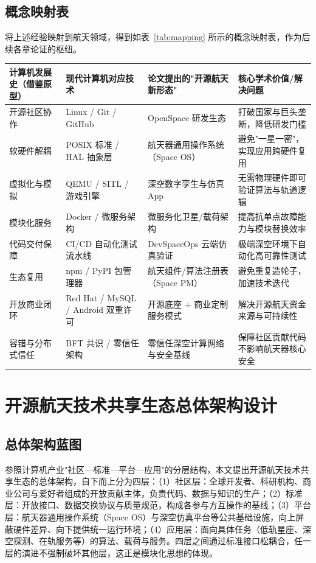\documentclass[UTF8,a4paper,zihao=-4]{ctexart}
\begin{document}
\subsection{概念映射表}
将上述经验映射到航天领域，得到如表~\ref{tab:mapping} 所示的概念映射表，作为后续各章论证的枢纽。

\begin{landscape}
\vfill
\centering
{}
\label{tab:mapping}
\begin{tabularx}{\textheight}{@{}>{\raggedright\arraybackslash}X>{\raggedright\arraybackslash}X>{\raggedright\arraybackslash}X>{\raggedright\arraybackslash}X@{}}
\toprule
计算机发展史（借鉴原型） & 现代计算机对应技术 & 论文提出的"开源航天新形态" & 核心学术价值/解决问题 \\
\midrule
开源社区协作 & Linux / Git / GitHub & OpenSpace 研发生态 & 打破国家与巨头垄断，降低研发门槛 \\
软硬件解耦 & POSIX 标准 / HAL 抽象层 & 航天器通用操作系统（Space OS） & 避免"一星一密"，实现应用跨硬件复用 \\
虚拟化与模拟 & QEMU / SITL / 游戏引擎 & 深空数字孪生与仿真 App & 无需物理硬件即可验证算法与轨道逻辑 \\
模块化服务 & Docker / 微服务架构 & 微服务化卫星/载荷架构 & 提高抗单点故障能力与模块替换效率 \\
代码交付保障 & CI/CD 自动化测试流水线 & DevSpaceOps 云端仿真验证 & 极端深空环境下自动化高可靠性测试 \\
生态复用 & npm / PyPI 包管理器 & 航天组件/算法注册表（Space PM） & 避免重复造轮子，加速技术迭代 \\
开放商业闭环 & Red Hat / MySQL / Android 双重许可 & 开源底座 + 商业定制服务模式 & 解决开源航天资金来源与可持续性 \\
容错与分布式信任 & BFT 共识 / 零信任架构 & 零信任深空计算网络与安全基线 & 保障社区贡献代码不影响航天器核心安全 \\
\bottomrule
\end{tabularx}
\vfill
\end{landscape}

\section{开源航天技术共享生态总体架构设计}
\subsection{总体架构蓝图}
参照计算机产业"社区—标准—平台—应用"的分层结构，本文提出开源航天技术共享生态的总体架构，自下而上分为四层：（1）社区层：全球开发者、科研机构、商业公司与爱好者组成的开放贡献主体，负责代码、数据与知识的生产；（2）标准层：开放接口、数据交换协议与质量规范，构成各参与方互操作的基线；（3）平台层：航天器通用操作系统（Space OS）与深空仿真平台等公共基础设施，向上屏蔽硬件差异、向下提供统一运行环境；（4）应用层：面向具体任务（低轨星座、深空探测、在轨服务等）的算法、载荷与服务。四层之间通过标准接口松耦合，任一层的演进不强制破坏其他层，这正是模块化思想的体现。
\end{document}
